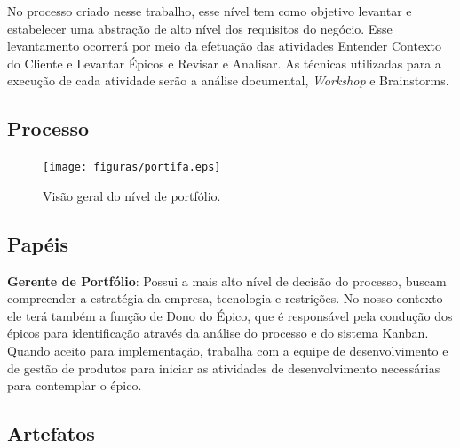 No processo criado nesse trabalho, esse nível tem como objetivo levantar e estabelecer
uma abstração de alto nível dos requisitos do negócio. Esse levantamento ocorrerá
por meio da efetuação das atividades Entender Contexto do Cliente e Levantar Épicos
e Revisar e Analisar. As técnicas utilizadas para a execução de cada atividade serão
a análise documental, \textit{Workshop} e Brainstorms.

\subsection{Processo}

\begin{figure}[H]
    \centering
  \texttt{[image: figuras/portifa.eps]}
    \caption{Visão geral do nível de portfólio.}
    \label{fig:portifa}
\end{figure}

\subsection{Papéis}

\textbf{Gerente de Portfólio}: Possui a mais alto nível de decisão do processo, buscam compreender
a estratégia da empresa, tecnologia e restrições. No nosso contexto ele terá também
a função de Dono do Épico, que é responsável pela condução dos épicos para identificação
através da análise do processo e do sistema Kanban. Quando aceito para implementação,
trabalha com a equipe de desenvolvimento e de gestão de produtos para iniciar as atividades
de desenvolvimento necessárias para contemplar o épico.

\subsection{Artefatos}



